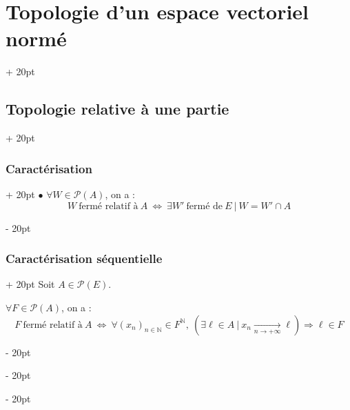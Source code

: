 \documentclass[a4paper, 12pt, twoside]{article}
\newcommand{\N}{\mathbb{N}} %
\newcommand{\tendsto}[1]{\xrightarrow[#1]{}}
\newcommand{\ssi}{\ \Leftrightarrow \ }
\newcommand{\ind}[1][20pt]{\advance\leftskip + #1}
\newcommand{\deind}[1][20pt]{\advance\leftskip - #1}
\newenvironment{indt}[2][20pt]{#2 \par \ind[#1]}{\par \deind} %
\begin{document}
\begin{indt}{\section{Topologie d'un espace vectoriel normé}}
\begin{indt}{\subsection{Topologie relative à une partie}}
\begin{indt}{\subsubsection{Caractérisation}}
                $\bullet$ $\forall W \in \mathcal P(A)$, on a :
                \[
                    W\ \text{fermé relatif à}\ A
                    \ssi
                    \exists W'\ \text{fermé de}\ E\ |\ W = W' \cap A
                \]
            \end{indt}

            \vspace{12pt}
            
            \begin{indt}{\subsubsection{Caractérisation séquentielle}}
                Soit $A \in \mathcal P(E)$.

                $\forall F \in \mathcal P(A)$, on a :
                \[
                    F\ \text{fermé relatif à}\ A
                    \ssi
                    \forall (x_n)_{n \in \N} \in F^\N,\
                    (\exists \ell \in A\ |\ x_n \tendsto{n \to +\infty} \ell) \Rightarrow \ell \in F
                \]
            \end{indt}
        \end{indt}
    \end{indt}

    \vspace{12pt}
    
\end{document}
